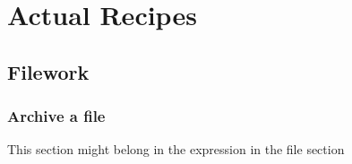 \part{Actual Recipes}
\label{part:Actual Recipes}

\chapter{Filework}
\label{chap:Filework}

\section{Archive a file}
\label{sec:Archive a file}
This section might belong in the expression in the file section